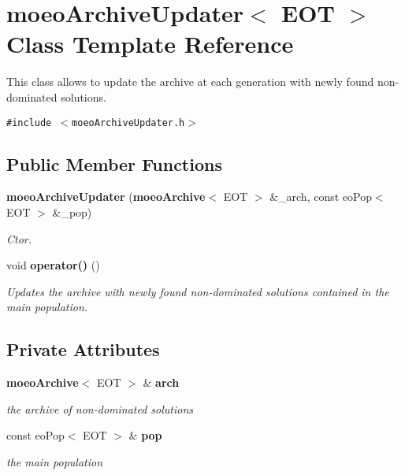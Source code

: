 \section{moeo\-Archive\-Updater$<$ EOT $>$ Class Template Reference}
\label{classmoeoArchiveUpdater}
This class allows to update the archive at each generation with newly found non-dominated solutions.  


{\tt \#include $<$moeo\-Archive\-Updater.h$>$}

\subsection*{Public Member Functions}
\begin{CompactItemize}
\item 
{\bf moeo\-Archive\-Updater} ({\bf moeo\-Archive}$<$ EOT $>$ \&\_\-arch, const eo\-Pop$<$ EOT $>$ \&\_\-pop)
\begin{CompactList}\small\item\em Ctor. \item\end{CompactList}\item 
void {\bf operator()} ()\label{classmoeoArchiveUpdater_19e98244f0dd641983af81d8dcaf0f7d}

\begin{CompactList}\small\item\em Updates the archive with newly found non-dominated solutions contained in the main population. \item\end{CompactList}\end{CompactItemize}
\subsection*{Private Attributes}
\begin{CompactItemize}
\item 
{\bf moeo\-Archive}$<$ EOT $>$ \& {\bf arch}\label{classmoeoArchiveUpdater_2fd7b92786ced836e3d0b5abfb801a86}

\begin{CompactList}\small\item\em the archive of non-dominated solutions \item\end{CompactList}\item 
const eo\-Pop$<$ EOT $>$ \& {\bf pop}\label{classmoeoArchiveUpdater_0fc3f08f0385c55569eb056737303363}

\begin{CompactList}\small\item\em the main population \item\end{CompactList}\end{CompactItemize}


